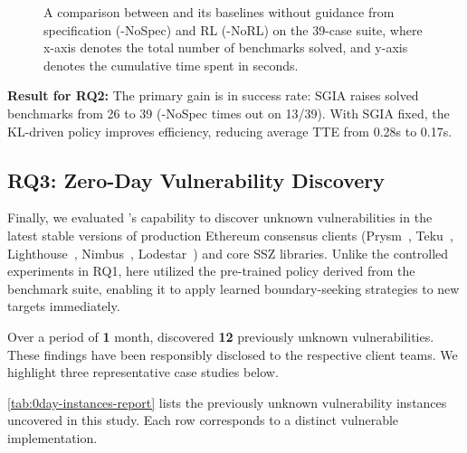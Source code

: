 \begin{figure}[]
    \caption{A comparison between \tool and its baselines without guidance from specification (\tool-NoSpec) and RL (\tool-NoRL) on the 39-case suite, where x-axis denotes the total number of benchmarks solved, and y-axis denotes the cumulative time spent in seconds.}
    \label{fig:ablation}
\end{figure}

\begin{mdframed}[
    backgroundcolor=gray!10,
    linecolor=white,
    skipabove=0.5em
    ]\noindent
    \textbf{Result for RQ2:} The primary gain is in success rate: SGIA raises solved benchmarks from 26 to 39 (\tool-NoSpec times out on 13/39). With SGIA fixed, the KL-driven policy improves efficiency, reducing average TTE from 0.28s to 0.17s.
\end{mdframed}

\subsection{RQ3: Zero-Day Vulnerability Discovery}

Finally, we evaluated \tool's capability to discover unknown vulnerabilities in the latest stable versions of production Ethereum consensus clients (Prysm~\cite{prysm}, Teku~\cite{teku}, Lighthouse~\cite{lighthouse}, Nimbus~\cite{nimbus}, Lodestar~\cite{lodestar}) and core SSZ libraries. Unlike the controlled experiments in RQ1, here \tool utilized the pre-trained policy derived from the benchmark suite, enabling it to apply learned boundary-seeking strategies to new targets immediately.

Over a period of \textbf{1} month, \tool discovered \textbf{12} previously unknown vulnerabilities. %
These findings have been responsibly disclosed to the respective client teams. We highlight three representative case studies below.


\autoref{tab:0day-instances-report} lists the previously unknown vulnerability instances uncovered in this study. Each row corresponds to a distinct vulnerable implementation.

